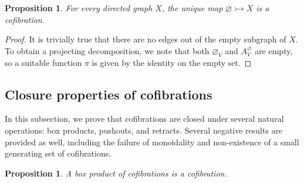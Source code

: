 \documentclass[11pt]{article}
\newtheorem{proposition}[theo]{Proposition}
\theoremstyle{definition}
\numberwithin{equation}{section}
\newcommand{\cto}{\rightarrowtail}
\begin{document}
\begin{proposition}\label{empty-cof}
For every directed graph $X$, the unique map $\varnothing \cto X$ is a cofibration. 
\end{proposition}

\begin{proof}
It is trivially true that there are no edges out of the empty subgraph of $X$. To obtain a projecting decomposition, we note that both $\varnothing_V$ and $A_V^\varnothing$ are empty, so a suitable function $\pi$ is given by the identity on the empty set.
\end{proof}

\subsection{Closure properties of cofibrations}

In this subsection, we prove that cofibrations are closed under several natural operations: box products, pushouts, and retracts.
Several negative results are provided as well, including the failure of monoidality and non-existence of a small generating set of cofibrations.

\begin{proposition}\label{box-prod-cofibs}
A box product of cofibrations is a cofibration.
\end{proposition}
\end{document}
